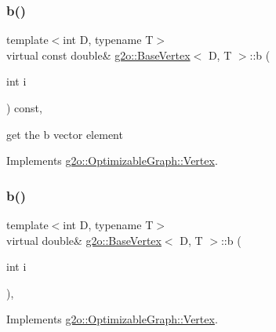 \subsubsection{\texorpdfstring{b()}{b()}\hspace{0.1cm}{\footnotesize\ttfamily [1/4]}}
{\footnotesize\ttfamily template$<$int D, typename T$>$ \\
virtual const double\& \mbox{\hyperlink{classg2o_1_1_base_vertex}{g2o\+::\+Base\+Vertex}}$<$ D, T $>$\+::b (\begin{DoxyParamCaption}\item[{int}]{i }\end{DoxyParamCaption}) const\hspace{0.3cm}{\ttfamily [inline]}, {\ttfamily [virtual]}}



get the b vector element 



Implements \mbox{\hyperlink{classg2o_1_1_optimizable_graph_1_1_vertex_a79afa60eb11928eeeb1b97f2d2a30732}{g2o\+::\+Optimizable\+Graph\+::\+Vertex}}.

\mbox{\label{classg2o_1_1_base_vertex_a5c235369ef3fb58de65b90c8cc37d611}} 
\subsubsection{\texorpdfstring{b()}{b()}\hspace{0.1cm}{\footnotesize\ttfamily [2/4]}}
{\footnotesize\ttfamily template$<$int D, typename T$>$ \\
virtual double\& \mbox{\hyperlink{classg2o_1_1_base_vertex}{g2o\+::\+Base\+Vertex}}$<$ D, T $>$\+::b (\begin{DoxyParamCaption}\item[{int}]{i }\end{DoxyParamCaption})\hspace{0.3cm}{\ttfamily [inline]}, {\ttfamily [virtual]}}



Implements \mbox{\hyperlink{classg2o_1_1_optimizable_graph_1_1_vertex_af2d92761ad2732b6e9b19bd52fa2a19b}{g2o\+::\+Optimizable\+Graph\+::\+Vertex}}.

\mbox{\label{classg2o_1_1_base_vertex_af7a70ede844ad023ba32edde16c8c745}} 
